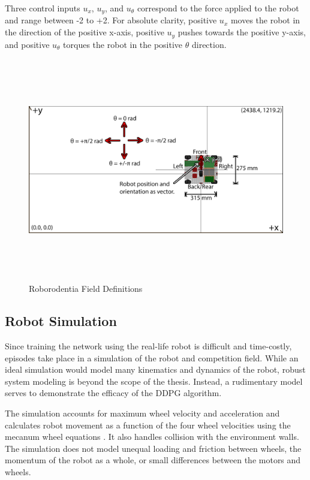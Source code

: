 Three control inputs $u_x$, $u_y$, and $u_\theta$ correspond to the force applied to the robot and range between -2 to +2. For absolute clarity, positive $u_x$ moves the robot in the direction of the positive x-axis, positive $u_y$ pushes towards the positive y-axis, and positive $u_\theta$ torques the robot in the positive $\theta$ direction. 
\begin{figure}[H]
	\includegraphics[width=6in, height=3.85in, keepaspectratio]{figures/field_defs.png}
	\caption{Roborodentia Field Definitions} \label{fig:field_defs}
\end{figure}

\subsection{Robot Simulation}
Since training the network using the real-life robot is difficult and time-costly, episodes take place in a simulation of the robot and competition field. While an ideal simulation would model many kinematics and dynamics of the robot, robust system modeling is beyond the scope of the thesis. Instead, a rudimentary model serves to demonstrate the efficacy of the DDPG algorithm. 

The simulation accounts for maximum wheel velocity and acceleration and calculates robot movement as a function of the four wheel velocities using the mecanum wheel equations \cite{li_2018}\cite{rahman_2014}. It also handles collision with the environment walls. The simulation does not model unequal loading and friction between wheels, the momentum of the robot as a whole, or small differences between the motors and wheels.

